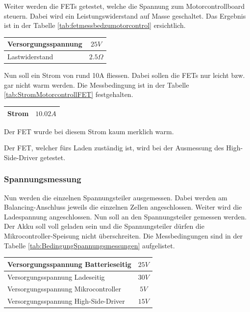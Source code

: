 Weiter werden die FETs getestet, welche die Spannung zum Motorcontrollboard steuern. Dabei wird ein Leistungswiderstand auf Masse geschaltet. Das Ergebnis ist in der Tabelle \ref{tab:fetmessbedzumotorcontrol} ersichtlich.

\begin{center}
	\begin{tabular}{l|c}
		\hline 
		Versorgungsspannung & $25V$ \\ \hline
		Lastwiderstand & $2.5\Omega$ \\ \hline
	\end{tabular} 
	\label{tab:fetmessbedzumotorcontrol}
\end{center}

Nun soll ein Strom von rund 10A fliessen. Dabei sollen die FETs nur leicht bzw. gar nicht warm werden. Die Messbedingung ist in der Tabelle \ref{tab:StromMotorcontrollFET} festgehalten.

\begin{center}
	\begin{tabular}{l|c}
		\hline 
		Strom & $10.02A$ \\ \hline
	\end{tabular} 
	\label{tab:StromMotorcontrollFET}
\end{center}

Der FET wurde bei diesem Strom kaum merklich warm.

Der FET, welcher fürs Laden zuständig ist, wird bei der Ausmessung des High-Side-Driver getestet.

\subsubsection*{Spannungsmessung}
Nun werden die einzelnen Spannungsteiler ausgemessen. Dabei werden am Balancing-Anschluss jeweils die einzelnen Zellen angeschlossen. Weiter wird die Ladespannung angeschlossen. Nun soll an den Spannungsteiler gemessen werden. Der Akku soll voll geladen sein und die Spannungsteiler dürfen die Mikrocontroller-Speisung nicht überschreiten. Die Messbedingungen sind in der Tabelle \ref{tab:BedingungSpannungsmessungen} aufgelistet.

\begin{center}
	\begin{tabular}{l|c}
		\hline 
		Versorgungsspannung Batterieseitig & $25V$ \\ \hline
		Versorgungsspannung Ladeseitig & $30V$ \\ \hline
		Versorgungsspannung Mikrocontroller & $5V$ \\ \hline
		Versorgungsspannung High-Side-Driver & $15V$ \\ \hline
		
	\end{tabular} 
	\label{tab:BedingungSpannungsmessungen}
\end{center}

